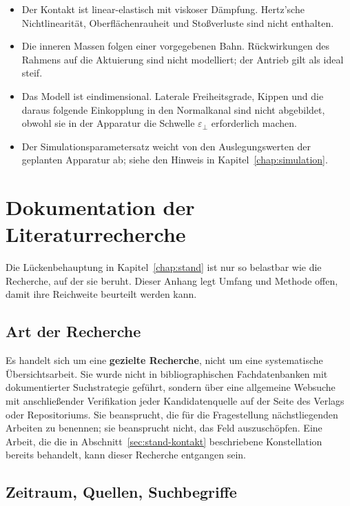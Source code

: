 \documentclass[12pt,a4paper]{report}
\begin{document}
\begin{itemize}
\item Der Kontakt ist linear-elastisch mit viskoser Dämpfung. Hertz'sche
      Nichtlinearität, Oberflächenrauheit und Stoßverluste sind nicht
      enthalten.
\item Die inneren Massen folgen einer vorgegebenen Bahn. Rückwirkungen
      des Rahmens auf die Aktuierung sind nicht modelliert; der Antrieb
      gilt als ideal steif.
\item Das Modell ist eindimensional. Laterale Freiheitsgrade, Kippen und
      die daraus folgende Einkopplung in den Normalkanal sind nicht
      abgebildet, obwohl sie in der Apparatur die Schwelle
      $\varepsilon_{\perp}$ erforderlich machen.
\item Der Simulationsparametersatz weicht von den Auslegungswerten der
      geplanten Apparatur ab; siehe den Hinweis in
      Kapitel~\ref{chap:simulation}.
\end{itemize}




\chapter{Dokumentation der Literaturrecherche}
\label{app:recherche}

Die Lückenbehauptung in Kapitel~\ref{chap:stand} ist nur so belastbar
wie die Recherche, auf der sie beruht. Dieser Anhang legt Umfang und
Methode offen, damit ihre Reichweite beurteilt werden kann.

\section{Art der Recherche}

Es handelt sich um eine \textbf{gezielte Recherche}, nicht um eine
systematische Übersichtsarbeit. Sie wurde nicht in bibliographischen
Fachdatenbanken mit dokumentierter Suchstrategie geführt, sondern über
eine allgemeine Websuche mit anschließender Verifikation jeder
Kandidatenquelle auf der Seite des Verlags oder Repositoriums. Sie
beansprucht, die für die Fragestellung nächstliegenden Arbeiten zu
benennen; sie beansprucht nicht, das Feld auszuschöpfen. Eine Arbeit,
die die in Abschnitt~\ref{sec:stand-kontakt} beschriebene Konstellation
bereits behandelt, kann dieser Recherche entgangen sein.

\section{Zeitraum, Quellen, Suchbegriffe}
\end{document}
